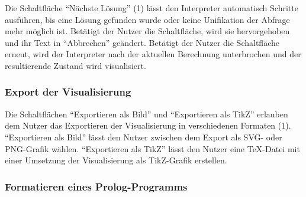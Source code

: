 \documentclass[parskip=full,11pt,twoside]{scrartcl}
\begin{document}
\begin{minipage}{\linewidth}
\end{minipage}

\begin{minipage}{\linewidth}
\end{minipage}

Die Schaltfläche \enquote{Nächste Lösung} (1) lässt den Interpreter automatisch Schritte ausführen, bis eine Lösung gefunden wurde oder keine Unifikation der Abfrage mehr möglich ist.
Betätigt der Nutzer die Schaltfläche, wird sie hervorgehoben und ihr Text in \enquote{Abbrechen} geändert.
Betätigt der Nutzer die Schaltfläche erneut, wird der Interpreter nach der aktuellen Berechnung unterbrochen und der resultierende Zustand wird visualisiert.

\subsubsection{Export der Visualisierung}

\begin{minipage}{\linewidth}
\end{minipage}

Die Schaltflächen \enquote{Exportieren als Bild} und \enquote{Exportieren als TikZ} erlauben dem Nutzer das Exportieren der Visualisierung in verschiedenen Formaten (1).
\enquote{Exportieren als Bild} lässt den Nutzer zwischen dem Export als SVG- oder PNG-Grafik wählen.
\enquote{Exportieren als TikZ} lässt den Nutzer eine TeX-Datei mit einer Umsetzung der Visualisierung als TikZ-Grafik erstellen.

\subsubsection{Formatieren eines Prolog-Programms}

\begin{minipage}{\linewidth}
\end{minipage}
\end{document}
